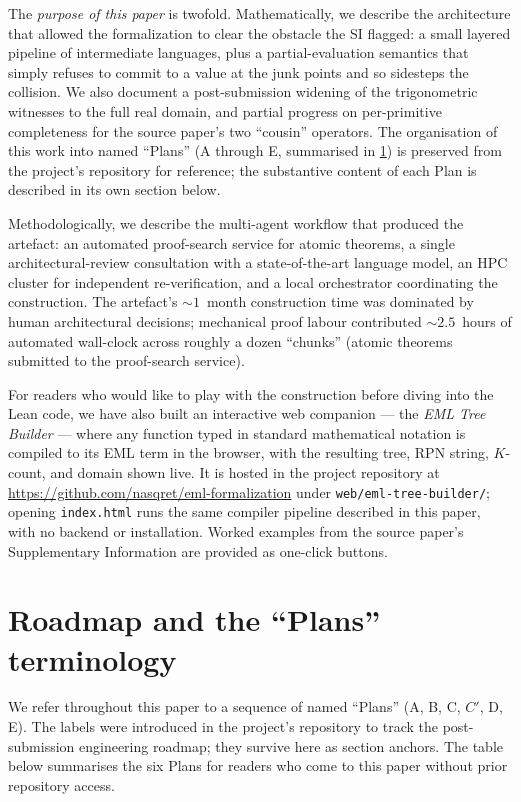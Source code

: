 \documentclass[11pt,a4paper]{article}
\theoremstyle{plain}
\theoremstyle{definition}
\begin{document}
The \emph{purpose of this paper} is twofold. Mathematically, we
describe the architecture that allowed the formalization to clear
the obstacle the SI flagged: a small layered pipeline of intermediate
languages, plus a partial-evaluation semantics that simply refuses to
commit to a value at the junk points and so sidesteps the collision.
We also document a post-submission widening of the trigonometric
witnesses to the full real domain, and partial progress on
per-primitive completeness for the source paper's two ``cousin''
operators. The organisation of this work into named ``Plans''
(A through E, summarised in \cref{sec:plans}) is preserved from the
project's repository for reference; the substantive content of each
Plan is described in its own section below.

Methodologically, we describe the multi-agent workflow that produced
the artefact: an automated proof-search service for atomic theorems,
a single architectural-review consultation with a state-of-the-art
language model, an HPC cluster for independent re-verification, and a
local orchestrator coordinating the construction. The artefact's
$\sim\!\!1$~month construction time was dominated by human
architectural decisions; mechanical proof labour contributed
$\sim\!\!2.5$~hours of automated wall-clock across roughly a dozen
``chunks'' (atomic theorems submitted to the proof-search service).

For readers who would like to play with the construction before
diving into the Lean code, we have also built an interactive web
companion --- the \emph{EML Tree Builder} --- where any function
typed in standard mathematical notation is compiled to its EML term
in the browser, with the resulting tree, RPN string, $K$-count, and
domain shown live. It is hosted in the project repository at
\url{https://github.com/nasqret/eml-formalization} under
\texttt{web/eml-tree-builder/}; opening \texttt{index.html} runs
the same compiler pipeline described in this paper, with no backend
or installation. Worked examples from the source paper's
Supplementary Information are provided as one-click buttons.

\section{Roadmap and the ``Plans'' terminology}
\label{sec:plans}

We refer throughout this paper to a sequence of named ``Plans''
(A, B, C, $C'$, D, E). The labels were introduced in the project's
repository to track the post-submission engineering roadmap; they
survive here as section anchors. The table below summarises the
six Plans for readers who come to this paper without prior repository
access.
\end{document}
